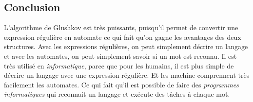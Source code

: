 \subsection{Conclusion}

L'algorithme de Glushkov est très puissants, puisqu'il permet de convertir une
expression régulière en automate ce qui fait qu'on gagne les avantages des deux
structures. Avec les expressions régulières, on peut simplement décrire un
langage et avec les automates, on peut simplement savoir si un mot est reconnu.
Il est très utilisé en \textit{informatique}, parce que pour les humains, il
est plus simple de décrire un langage avec une expression régulière. Et les
machine comprennent très facilement les automates. Ce qui fait qu'il est
possible de faire des \textit{programmes informatiques} qui reconnait un
langage et exécute des tâches à chaque mot.
